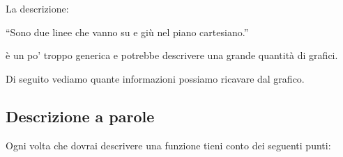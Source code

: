 La descrizione:

``Sono due linee che vanno su e giù nel piano cartesiano.''

è un po' troppo generica e potrebbe descrivere una grande quantità di grafici.

Di seguito vediamo quante informazioni possiamo ricavare dal grafico.

\subsection{Descrizione a parole}

Ogni volta che dovrai descrivere una funzione tieni conto dei seguenti punti:

 
